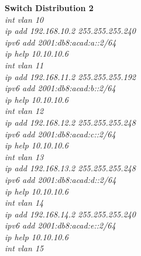 \documentclass[a4paper, 12pt]{article}
\begin{document}
\hspace*{1cm}\textbf{Switch Distribution 2}\\
\hspace*{2cm}\textit{int vlan 10\\
\hspace*{2cm}ip add 192.168.10.2 255.255.255.240\\
\hspace*{2cm}ipv6 add 2001:db8:acad:a::2/64\\
\hspace*{2cm}ip help 10.10.10.6\\
\hspace*{2cm}int vlan 11\\
\hspace*{2cm}ip add 192.168.11.2 255.255.255.192\\
\hspace*{2cm}ipv6 add 2001:db8:acad:b::2/64\\
\hspace*{2cm}ip help 10.10.10.6\\
\hspace*{2cm}int vlan 12\\
\hspace*{2cm}ip add 192.168.12.2 255.255.255.248\\
\hspace*{2cm}ipv6 add 2001:db8:acad:c::2/64\\
\hspace*{2cm}ip help 10.10.10.6\\
\hspace*{2cm}int vlan 13\\
\hspace*{2cm}ip add 192.168.13.2 255.255.255.248\\
\hspace*{2cm}ipv6 add 2001:db8:acad:d::2/64\\
\hspace*{2cm}ip help 10.10.10.6\\
\hspace*{2cm}int vlan 14\\
\hspace*{2cm}ip add 192.168.14.2 255.255.255.240\\
\hspace*{2cm}ipv6 add 2001:db8:acad:e::2/64\\
\hspace*{2cm}ip help 10.10.10.6\\
\hspace*{2cm}int vlan 15\\
}
\end{document}

